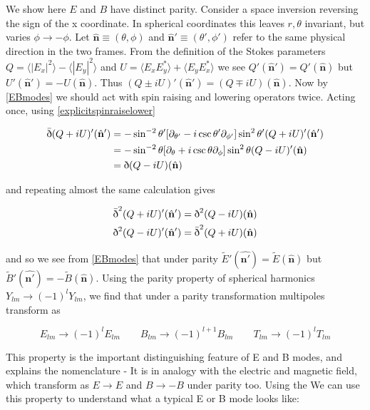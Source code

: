 \documentclass[a4paper,10pt]{article}
\renewcommand{\v}[1]{\mathbf{#1}}
\newcommand{\unit}[1]{\hat{\v{#1}}}
\newcommand{\sr}{\text{\normalfont\dh}}
\renewcommand{\sl}{\bar{\text{\normalfont\dh}}}
\begin{document}
We show here $E$ and $B$ have distinct parity. Consider a space inversion reversing the sign of the x coordinate. In spherical coordinates this leaves $r, \theta$ invariant, but varies $\phi \rightarrow -\phi$.  Let $\unit{n}\equiv(\theta, \phi)$ and $\unit{n}'\equiv(\theta', \phi')$ refer to the same physical direction in the two frames. From the definition of the Stokes parameters $Q=\langle |E_x|^2 \rangle - \langle |E_y|^2 \rangle$ and $U = \langle E_xE_y^* \rangle + \langle E_yE_x^* \rangle$ we see $Q'(\unit{n}') = Q'(\unit{n})$ but $U'(\unit{n}') = -U(\unit{n})$. Thus $(Q\pm iU)'(\unit{n}') = (Q\mp iU)(\unit{n})$. Now by \ref{EBmodes} we should act with spin raising and lowering operators twice. Acting once, using \ref{explicitspinraiselower}

\begin{equation}\begin{split}
\sl(Q+iU)'(\unit{n}') &= -\sin^{-2}{\theta'}[\partial_{\theta'}-i\csc{\theta'}\partial_{\phi'}]\sin^{2}{\theta'}(Q+iU)'(\unit{n}')\\
&= -\sin^{-2}{\theta}[\partial_{\theta}+i\csc{\theta}\partial_{\phi}]\sin^{2}{\theta}(Q-iU)'(\unit{n})\\
&= \sr (Q-iU)(\unit{n})
\end{split}\end{equation}

and repeating almost the same calculation gives 

\begin{equation}\begin{split}
\sl^2(Q+iU)'(\unit{n}') = \sr^2 (Q-iU)(\unit{n})\\
\sr^2(Q-iU)'(\unit{n}') = \sl^2 (Q+iU)(\unit{n})
\end{split}\end{equation}

and so we see from \ref{EBmodes} that under parity $\tilde{E}'(\unit{n'})=\tilde{E}(\unit{n})$ but $\tilde{B}'(\unit{n'})=-\tilde{B}(\unit{n})$. Using the parity property of spherical harmonics $Y_{lm}\rightarrow(-1)^lY_{lm}$, we find that under a parity transformation multipoles transform as

\begin{equation}
E_{lm} \rightarrow (-1)^lE_{lm} \qquad B_{lm} \rightarrow (-1)^{l+1}B_{lm} \qquad T_{lm} \rightarrow (-1)^lT_{lm}
\end{equation} 

This property is the important distinguishing feature of E and B modes, and explains the nomenclature - It is in analogy with the electric and magnetic field, which transform as $E\rightarrow E$ and $B\rightarrow -B$ under parity too. Using the We can use this property to understand what a typical E or B mode looks like:
\end{document}

